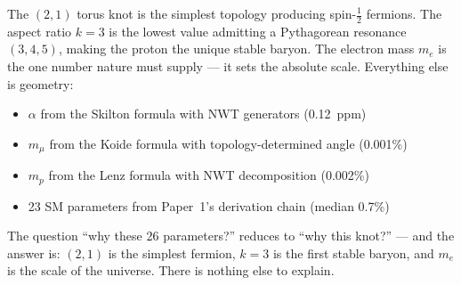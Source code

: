 \documentclass[11pt,a4paper]{article}
\begin{document}
The $(2,1)$ torus knot is the simplest topology producing spin-$\tfrac{1}{2}$ fermions. The aspect ratio $k = 3$ is the lowest value admitting a Pythagorean resonance $(3,4,5)$, making the proton the unique stable baryon. The electron mass $m_e$ is the one number nature must supply --- it sets the absolute scale. Everything else is geometry:
\begin{itemize}
  \item $\alpha$ from the Skilton formula with NWT generators (0.12~ppm)
  \item $m_\mu$ from the Koide formula with topology-determined angle (0.001\%)
  \item $m_p$ from the Lenz formula with NWT decomposition (0.002\%)
  \item 23 SM parameters from Paper~1's derivation chain (median 0.7\%)
\end{itemize}

The question ``why these 26 parameters?'' reduces to ``why this knot?'' --- and the answer is: $(2,1)$ is the simplest fermion, $k=3$ is the first stable baryon, and $m_e$ is the scale of the universe. There is nothing else to explain.
\end{document}
